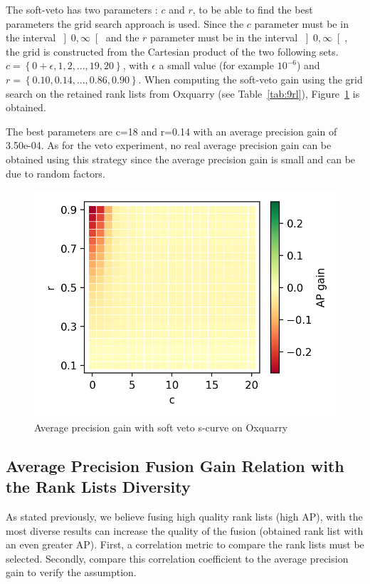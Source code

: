 The soft-veto has two parameters : $c$ and $r$, to be able to find the best parameters the grid search approach is used.
Since the $c$ parameter must be in the interval $\left]0, \infty\right[$ and the $r$ parameter must be in the interval $\left]0, \infty\right[$, the grid is constructed from the Cartesian product of the two following sets.
$c = \left\{0 + \epsilon, 1, 2, ..., 19, 20\right\}$, with $\epsilon$ a small value (for example $10^{-6}$) and $r = \left\{0.10, 0.14, ..., 0.86, 0.90\right\}$.
When computing the soft-veto gain using the grid search on the retained rank lists from Oxquarry (see Table~\ref{tab:9rl}), Figure~\ref{fig:soft_veto} is obtained.

The best parameters are c=18 and r=0.14 with an average precision gain of 3.50e-04.
As for the veto experiment, no real average precision gain can be obtained using this strategy since the average precision gain is small and can be due to random factors.

\begin{figure}
  \caption{Average precision gain with soft veto s-curve on Oxquarry}
  \label{fig:soft_veto}
  \includegraphics[width=\linewidth]{img/soft_veto.png}
\end{figure}

\subsection{Average Precision Fusion Gain Relation with the Rank Lists Diversity}

As stated previously, we believe fusing high quality rank lists (high AP), with the most diverse results can increase the quality of the fusion (obtained rank list with an even greater AP).
First, a correlation metric to compare the rank lists must be selected.
Secondly, compare this correlation coefficient to the average precision gain to verify the assumption.

